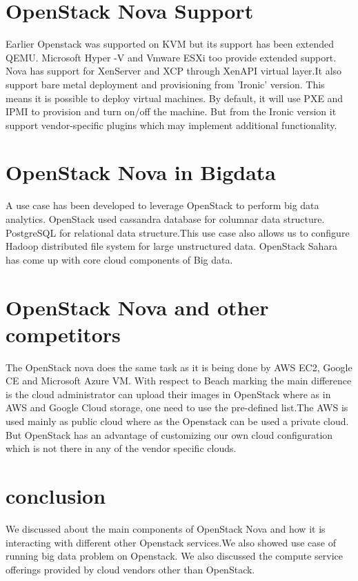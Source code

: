 \documentclass[9pt,twocolumn,twoside]{styles/osajnl}
\begin{document}
\section{OpenStack Nova Support}
Earlier Openstack was supported on KVM but its support has been extended QEMU. Microsoft Hyper -V and Vmware ESXi too provide extended support. Nova has support for XenServer and XCP through XenAPI virtual layer.It also support bare metal deployment and provisioning from 'Ironic' version. This means it is possible to deploy virtual machines. By default, it will use PXE and IPMI to provision and turn on/off the machine. But from the Ironic version it support vendor-specific plugins which may implement additional functionality. 


\section{OpenStack Nova in Bigdata}

A use case has been developed to leverage OpenStack to perform big data analytics. OpenStack used cassandra database for columnar data structure. PostgreSQL for relational data structure.This use case also allows us to configure Hadoop distributed file system for large unstructured data. OpenStack Sahara has come up with core cloud components of Big data\cite{www-nova-bigdata}.

\section{OpenStack Nova and other competitors}
 The OpenStack nova does the same task as it is being done by AWS EC2, Google CE and Microsoft Azure VM. With respect to Beach marking the main difference is the cloud administrator can upload their images in OpenStack where as in AWS and Google Cloud storage, one need to use the pre-defined list.The AWS is used mainly as public cloud where as the Openstack can be used a private cloud. But OpenStack has an advantage of customizing our own cloud configuration which is not there in any of the vendor specific clouds.

\section{conclusion}

We discussed about the main components of OpenStack Nova and how it is interacting with different other Openstack services.We also showed use case of running big data problem on Openstack. We also discussed the compute service offerings provided by cloud vendors other than OpenStack.


\end{document}
